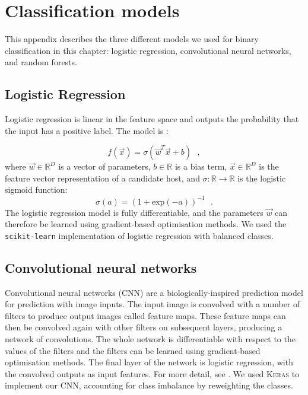 
\appendix


\section{Classification models}\label{sec:atlas-xid-models}

  This appendix describes the three different models we used for binary classification in this chapter: logistic
  regression, convolutional neural networks, and random forests.

  \subsection{Logistic Regression}
  \label{sec:atlas-logistic-regression}
    Logistic regression is linear in the feature space and outputs the
    probability that the input has a positive label. The model is
    \citep{bishop06ml}:

    \begin{equation}
        f(\vec x) = \sigma(\vec w^T \vec x + b) \,\,\,\,,
    \end{equation}
    where $\vec w \in \mathbb{R}^D$ is a vector of parameters, $b \in \mathbb{R}$ is a bias term, $\vec x \in \mathbb{R}^D$ is the feature vector representation of a candidate host, and $\sigma : \mathbb{R} \to \mathbb{R}$ is the logistic sigmoid function: \begin{equation}
        \sigma(a) = (1 + \mathrm{exp}(-a))^{-1}\,\,\,\,.
    \end{equation}%
    The logistic regression model is fully differentiable, and the parameters
    $\vec w$ can therefore be learned using gradient-based optimisation
    methods. {We used the \texttt{scikit-learn} \citep{pedregosa11sklearn}
    implementation of logistic regression with balanced classes}.

  \subsection{Convolutional neural networks}
  \label{sec:atlas-convolutional-neural-networks}

    Convolutional neural networks (CNN) are a biologically-inspired prediction
    model for prediction with image inputs. The input image is convolved with
    a number of filters to produce output images called feature maps. These
    feature maps can then be convolved again with other filters on subsequent
    layers, producing a network of convolutions. The whole network is
    differentiable with respect to the values of the filters and the filters
    can be learned using gradient-based optimisation methods. The final layer
    of the network is logistic regression, with the convolved outputs as input
    features. For more detail, see \citet[subsection II.A][]{lecun98}. We used
    \textsc{Keras} \citep{chollet15keras} to implement our CNN, accounting for
    class imbalance by reweighting the classes.

